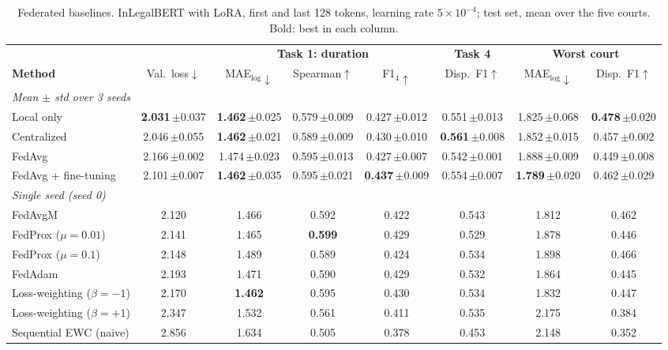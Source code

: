 \begin{table}[H]
\centering
\footnotesize
\setlength{\tabcolsep}{3.5pt}
\renewcommand{\arraystretch}{1.08}
\begin{tabular}{l c ccc c cc}
\toprule
& & \multicolumn{3}{c}{\textbf{Task 1: duration}} & \textbf{Task 4} & \multicolumn{2}{c}{\textbf{Worst court}} \\
\cmidrule(lr){3-5}\cmidrule(lr){6-6}\cmidrule(lr){7-8}
\textbf{Method} & Val.\ loss$\downarrow$ & MAE$_{\log}\downarrow$ & Spearman$\uparrow$ & F1$_4\uparrow$ & Disp.\ F1$\uparrow$ & MAE$_{\log}\downarrow$ & Disp.\ F1$\uparrow$ \\
\midrule
\multicolumn{8}{l}{\textit{Mean $\pm$ std over 3 seeds}} \\
Local only & \textbf{2.031}\,{\scriptsize$\pm$0.037} & \textbf{1.462}\,{\scriptsize$\pm$0.025} & 0.579\,{\scriptsize$\pm$0.009} & 0.427\,{\scriptsize$\pm$0.012} & 0.551\,{\scriptsize$\pm$0.013} & 1.825\,{\scriptsize$\pm$0.068} & \textbf{0.478}\,{\scriptsize$\pm$0.020} \\
Centralized & 2.046\,{\scriptsize$\pm$0.055} & \textbf{1.462}\,{\scriptsize$\pm$0.021} & 0.589\,{\scriptsize$\pm$0.009} & 0.430\,{\scriptsize$\pm$0.010} & \textbf{0.561}\,{\scriptsize$\pm$0.008} & 1.852\,{\scriptsize$\pm$0.015} & 0.457\,{\scriptsize$\pm$0.002} \\
FedAvg & 2.166\,{\scriptsize$\pm$0.002} & 1.474\,{\scriptsize$\pm$0.023} & 0.595\,{\scriptsize$\pm$0.013} & 0.427\,{\scriptsize$\pm$0.007} & 0.542\,{\scriptsize$\pm$0.001} & 1.888\,{\scriptsize$\pm$0.009} & 0.449\,{\scriptsize$\pm$0.008} \\
FedAvg + fine-tuning & 2.101\,{\scriptsize$\pm$0.007} & \textbf{1.462}\,{\scriptsize$\pm$0.035} & 0.595\,{\scriptsize$\pm$0.021} & \textbf{0.437}\,{\scriptsize$\pm$0.009} & 0.554\,{\scriptsize$\pm$0.007} & \textbf{1.789}\,{\scriptsize$\pm$0.020} & 0.462\,{\scriptsize$\pm$0.029} \\
\midrule
\multicolumn{8}{l}{\textit{Single seed (seed 0)}} \\
FedAvgM & 2.120 & 1.466 & 0.592 & 0.422 & 0.543 & 1.812 & 0.462 \\
FedProx ($\mu{=}0.01$) & 2.141 & 1.465 & \textbf{0.599} & 0.429 & 0.529 & 1.878 & 0.446 \\
FedProx ($\mu{=}0.1$) & 2.148 & 1.489 & 0.589 & 0.424 & 0.534 & 1.898 & 0.466 \\
FedAdam & 2.193 & 1.471 & 0.590 & 0.429 & 0.532 & 1.864 & 0.445 \\
Loss-weighting ($\beta{=}{-}1$) & 2.170 & \textbf{1.462} & 0.595 & 0.430 & 0.534 & 1.832 & 0.447 \\
Loss-weighting ($\beta{=}{+}1$) & 2.347 & 1.532 & 0.561 & 0.411 & 0.535 & 2.175 & 0.384 \\
Sequential EWC (naive) & 2.856 & 1.634 & 0.505 & 0.378 & 0.453 & 2.148 & 0.352 \\
\bottomrule
\end{tabular}
\caption{Federated baselines. InLegalBERT with LoRA, first and last 128 tokens, learning rate $5{\times}10^{-4}$; test set, mean over the five courts. Bold: best in each column.}
\label{tab:fl_results}
\end{table}

